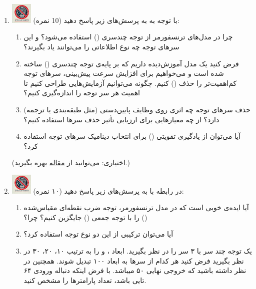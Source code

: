\documentclass[12pt]{article}
\begin{document}
\begin{enumerate}
    \item \includegraphics[width=1cm]{figs/Forbidden_AI.jpg}
    	با توجه به  به پرسش‌های زیر پاسخ دهید (10 نمره):
        \begin{enumerate}
            \item	چرا در مدل‌های ترنسفورمر از توجه چندسری () استفاده می‌شود؟ و این سرهای توجه چه نوع اطلاعاتی را می‌توانند یاد بگیرند؟
            \item 	فرض کنید یک مدل آموزش‌دیده داریم که بر پایه‌ی توجه چندسری () ساخته شده است و می‌خواهیم برای افزایش سرعت پیش‌بینی، سرهای توجه کم‌اهمیت‌تر را حذف () کنیم. چگونه می‌توانیم آزمایش‌هایی طراحی کنیم تا اهمیت هر سر توجه را اندازه‌گیری کنیم؟
            \item 	حذف سرهای توجه چه اثری روی وظایف پایین‌دستی (مثل طبقه‌بندی یا ترجمه) دارد؟ از چه معیارهایی برای ارزیابی تأثیر حذف سرها استفاده کنیم؟
            \item 	آیا می‌توان از یادگیری تقویتی () برای انتخاب دینامیک سرهای توجه استفاده کرد؟
        \end{enumerate}
        (اختیاری: می‌توانید از \href{https://arxiv.org/abs/1905.10650}{مقاله}  بهره بگیرید.)
    \item \includegraphics[width=1cm]{figs/Forbidden_AI.jpg}
    در رابطه با  به پرسش‌های زیر پاسخ دهید (۱۰ نمره):
    \begin{enumerate}
        \item آیا ایده‌ی خوبی است که در مدل ترنسفورمر، توجه ضرب نقطه‌ای مقیاس‌شده () را با توجه جمعی () جایگزین کنیم؟ چرا؟
        \item آیا می‌توان ترکیبی از این دو نوع توجه استفاده کرد؟
        \item یک توجه چند سر  با ۳ سر را در نظر بگیرید. ابعاد  ، و  را به ترتیب ۱۰، ۲۰، ۳۰ در نظر بگیرید فرض کنید هر کدام از سرها به ابعاد ۱۰۰ تبدیل شوند. همچنین در نظر داشته باشید که خروجی نهایی ۵۰ میباشد. با فرض اینکه دنباله ورودی ۶۴ تایی باشد، تعداد پارامترها را مشخص کنید.
    \end{enumerate}


\end{enumerate}
\end{document}

